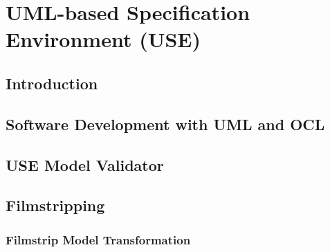 \section{UML-based Specification Environment (USE)}

\subsection{Introduction}

\subsection{Software Development with UML and OCL}

\subsection{USE Model Validator}

\subsection{Filmstripping}

\subsubsection{Filmstrip Model Transformation}